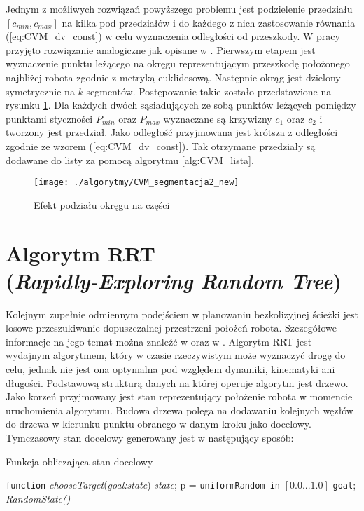 	Jednym z możliwych rozwiązań powyższego problemu jest podzielenie przedziału $[c_{min},c_{max}]$ na kilka
	pod przedziałów i do każdego z nich zastosowanie równania (\ref{eq:CVM_dv_const}) w celu wyznaczenia odległości od przeszkody. W pracy przyjęto rozwiązanie analogiczne jak opisane w \cite{majchrowski}.
	Pierwszym etapem jest wyznaczenie punktu leżącego na okręgu reprezentującym przeszkodę położonego najbliżej robota zgodnie z  metryką euklidesową. Następnie okrąg jest dzielony symetrycznie na $k$  segmentów. Postępowanie takie zostało przedstawione na rysunku \ref{fig:CVM_segmentacja2}. 
	Dla każdych dwóch sąsiadujących ze sobą punktów leżących pomiędzy punktami styczności $P_{min}$ oraz $P_{max}$
 	wyznaczane są krzywizny $c_1$ oraz $c_2$ i tworzony jest przedział. Jako odległość przyjmowana jest krótsza 
	z odległości zgodnie ze wzorem (\ref{eq:CVM_dv_const}). Tak otrzymane przedziały są dodawane do listy za pomocą algorytmu \ref{alg:CVM_lista}.
	
	\begin{figure}[H]
	\centering
	\texttt{[image: ./algorytmy/CVM\_segmentacja2\_new]}
	\caption{ Efekt podziału okręgu na części} \label{fig:CVM_segmentacja2}
	\end{figure} 
\section{Algorytm RRT\\(\textit{Rapidly-Exploring Random Tree}) \label{sec:RRT:basic}}
Kolejnym zupełnie odmiennym podejściem w planowaniu bezkolizyjnej ścieżki jest losowe przeszukiwanie dopuszczalnej przestrzeni położeń robota. Szczegółowe informacje na
jego temat można znaleźć w \cite{RRT} oraz w \cite{RRT2}.
Algorytm RRT jest wydajnym algorytmem, który w czasie rzeczywistym może wyznaczyć drogę do celu, jednak nie jest ona optymalna pod względem dynamiki, kinematyki ani długości.
Podstawową strukturą danych na której operuje algorytm jest drzewo. Jako korzeń przyjmowany jest stan reprezentujący położenie robota w momencie uruchomienia algorytmu.
Budowa drzewa polega na dodawaniu kolejnych węzłów do drzewa w kierunku punktu obranego w danym kroku jako docelowy. Tymczasowy stan docelowy generowany jest w następujący sposób:
 \begin{algorithm}[H]
	
	\caption{ Funkcja obliczająca stan docelowy }
	\label{alg:chooseTarget}
	\begin{algorithmic}
	\STATE \texttt{function} \textit{chooseTarget}(\textit{goal:state}) \textit{state};
	\STATE p = \texttt{uniformRandom in} $[0.0 ...1.0]$
	  \RETURN  \texttt{goal};
	  \RETURN \textit{RandomState()}
	\ENDIF
	\end{algorithmic}
  \end{algorithm}

